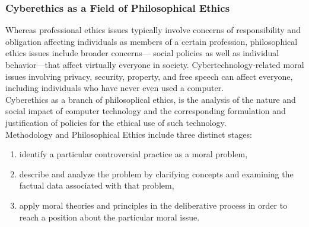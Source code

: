 \documentclass[12pt]{article}
\theoremstyle{definition}
\begin{document}
\subsubsection{Cyberethics as a Field of Philosophical Ethics}
Whereas professional
ethics issues typically involve concerns of responsibility and obligation affecting individuals
as members of a certain profession, philosophical ethics issues include broader concerns—
social policies as well as individual behavior—that affect virtually everyone in society.
Cybertechnology-related moral issues involving privacy, security, property, and free
speech can affect everyone, including individuals who have never even used a computer.\\
Cyberethics as a branch of philosoplical ethics, is the analysis of the nature and social impact of computer technology and the corresponding
formulation and justification of policies for the ethical use of such technology.\\
Methodology and Philosophical Ethics include three distinct stages:
\begin{enumerate}
\item identify a particular controversial practice as a moral problem,
\item describe and analyze the problem by clarifying concepts and examining the
factual data associated with that problem,
\item apply moral theories and principles in the deliberative process in order to reach a
position about the particular moral issue.
\end{enumerate}
\end{document}
